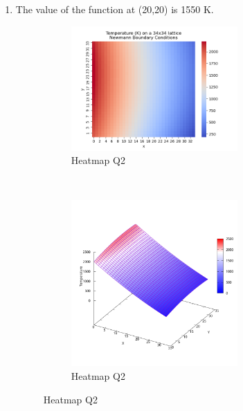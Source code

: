 \documentclass[11 pt]{article}
\begin{document}
\begin{enumerate}
\item The value of the function at (20,20) is 1550 K.
\begin{figure}[ht!]
\centering
\begin{subfigure}{0.5\textwidth}
\includegraphics[width=2.5in]{../figures/Q2-heatmap.png}
\caption{Heatmap Q2}
\label{q2_heatmap}
\end{subfigure}%
~
\begin{subfigure}{0.5\textwidth}
\includegraphics[width=2.5in]{../figures/Q2-3d.png}
\caption{Heatmap Q2}
\label{q2_3dplot}
\end{subfigure}
\end{figure}
\end{enumerate}
\end{document}
